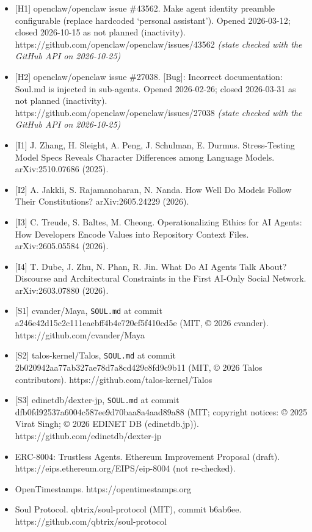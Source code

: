 \documentclass[10pt]{article}
\begin{document}
\begin{itemize}
\item
  {[}H1{]} openclaw/openclaw issue \#43562. Make agent identity preamble configurable (replace hardcoded `personal assistant'). Opened 2026-03-12; closed 2026-10-15 as not planned (inactivity). https://github.com/openclaw/openclaw/issues/43562 \emph{(state checked with the GitHub API on 2026-10-25)}
\item
  {[}H2{]} openclaw/openclaw issue \#27038. {[}Bug{]}: Incorrect documentation: Soul.md is injected in sub-agents. Opened 2026-02-26; closed 2026-03-31 as not planned (inactivity). https://github.com/openclaw/openclaw/issues/27038 \emph{(state checked with the GitHub API on 2026-10-25)}
\item
  {[}I1{]} J. Zhang, H. Sleight, A. Peng, J. Schulman, E. Durmus. Stress-Testing Model Specs Reveals Character Differences among Language Models. arXiv:2510.07686 (2025).
\item
  {[}I2{]} A. Jakkli, S. Rajamanoharan, N. Nanda. How Well Do Models Follow Their Constitutions? arXiv:2605.24229 (2026).
\item
  {[}I3{]} C. Treude, S. Baltes, M. Cheong. Operationalizing Ethics for AI Agents: How Developers Encode Values into Repository Context Files. arXiv:2605.05584 (2026).
\item
  {[}I4{]} T. Dube, J. Zhu, N. Phan, R. Jin. What Do AI Agents Talk About? Discourse and Architectural Constraints in the First AI-Only Social Network. arXiv:2603.07880 (2026).
\item
  {[}S1{]} cvander/Maya, \texttt{SOUL.\allowbreak{}md} at commit a246e42d15c2c111eaebff4b4e720cf5f410cd5e (MIT, © 2026 cvander). https://github.com/cvander/Maya
\item
  {[}S2{]} talos-kernel/Talos, \texttt{SOUL.\allowbreak{}md} at commit 2b020942aa77ab327ae78d7a8cd429c8fd9c9b11 (MIT, © 2026 Talos contributors). https://github.com/talos-kernel/Talos
\item
  {[}S3{]} edinetdb/dexter-jp, \texttt{SOUL.\allowbreak{}md} at commit dfb0fd92537a6004c587ee9d70baa8a4aad89a88 (MIT; copyright notices: © 2025 Virat Singh; © 2026 EDINET DB (edinetdb.jp)). https://github.com/edinetdb/dexter-jp
\item
  ERC-8004: Trustless Agents. Ethereum Improvement Proposal (draft). https://eips.ethereum.org/EIPS/eip-8004 (not re-checked).
\item
  OpenTimestamps. https://opentimestamps.org
\item
  Soul Protocol. qbtrix/soul-protocol (MIT), commit b6ab6ee. https://github.com/qbtrix/soul-protocol
\end{itemize}
\end{document}
